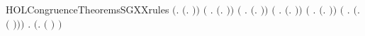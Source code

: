 \begin{SaveVerbatim}{HOLCongruenceTheoremsSGXXrules}
\HOLTokenTurnstile{} \ensuremath{(}\HOLSymConst{\HOLTokenForall{}}.  \ensuremath{(}\HOLTokenLambda{}. \ensuremath{)}\ensuremath{)} \HOLSymConst{\HOLTokenConj{}} \ensuremath{(}\HOLSymConst{\HOLTokenForall{}} .   \HOLSymConst{\HOLTokenImp{}}  \ensuremath{(}\HOLTokenLambda{}.  \HOLSymConst{\ensuremath{\ldotp}} \ensuremath{)}\ensuremath{)} \HOLSymConst{\HOLTokenConj{}}
   \ensuremath{(}\HOLSymConst{\HOLTokenForall{}} .   \HOLSymConst{\HOLTokenImp{}}  \ensuremath{(}\HOLTokenLambda{}. \HOLSymConst{\ensuremath{\ldotp}} \ensuremath{)}\ensuremath{)} \HOLSymConst{\HOLTokenConj{}}
   \ensuremath{(}\HOLSymConst{\HOLTokenForall{}} .   \HOLSymConst{\HOLTokenConj{}}   \HOLSymConst{\HOLTokenImp{}}  \ensuremath{(}\HOLTokenLambda{}.   \HOLSymConst{\ensuremath{+}}  \ensuremath{)}\ensuremath{)} \HOLSymConst{\HOLTokenConj{}}
   \ensuremath{(}\HOLSymConst{\HOLTokenForall{}} .   \HOLSymConst{\HOLTokenConj{}}   \HOLSymConst{\HOLTokenImp{}}  \ensuremath{(}\HOLTokenLambda{}.   \HOLSymConst{\ensuremath{\mid}}  \ensuremath{)}\ensuremath{)} \HOLSymConst{\HOLTokenConj{}}
   \ensuremath{(}\HOLSymConst{\HOLTokenForall{}} .   \HOLSymConst{\HOLTokenImp{}}  \ensuremath{(}\HOLTokenLambda{}.   \ensuremath{(} \ensuremath{)}\ensuremath{)}\ensuremath{)} \HOLSymConst{\HOLTokenConj{}}
   \HOLSymConst{\HOLTokenForall{}} .   \HOLSymConst{\HOLTokenImp{}}  \ensuremath{(}\HOLTokenLambda{}.  \ensuremath{(} \ensuremath{)} \ensuremath{)}
\end{SaveVerbatim}
